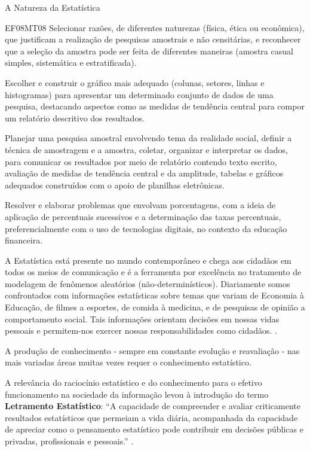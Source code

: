 \begin{apresentacao}{A Natureza da Estatística}
\begin{habilities}{EF08MT08}
Selecionar razões, de diferentes naturezas (física, ética ou econômica), que justificam a realização de pesquisas amostrais e não censitárias, e reconhecer que a seleção da amostra pode ser feita de diferentes maneiras (amostra casual simples, sistemática e estratificada).

Escolher e construir o gráfico mais adequado (colunas, setores, linhas e histogramas) para apresentar um determinado conjunto de dados de uma pesquisa, destacando aspectos como as medidas de tendência central para compor um relatório descritivo dos resultados.

Planejar uma pesquisa amostral envolvendo tema da realidade social, definir a técnica de amostragem e a amostra, coletar, organizar e interpretar os dados, para comunicar os resultados por meio de relatório contendo texto escrito, avaliação de medidas de tendência central e da amplitude, tabelas e gráficos adequados construídos com o apoio de planilhas eletrônicas.

Resolver e elaborar problemas que envolvam porcentagens, com a ideia de aplicação de percentuais sucessivos e a determinação das taxas percentuais, preferencialmente com o uso de tecnologias digitais, no contexto da educação financeira.
\end{habilities}

A Estatística está presente no mundo contemporâneo e chega aos cidadãos em todos os meios de comunicação e é a ferramenta por excelência no tratamento de modelagem de fenômenos aleatórios (não-determinísticos). Diariamente somos confrontados com informações estatísticas sobre temas que variam de Economia à Educação, de filmes a esportes, de comida à medicina, e de pesquisas de opinião a comportamento social. Tais informações orientam decisões em nossas vidas pessoais e permitem-nos exercer nossas responsabilidades como cidadãos. \citep{franklin2007}.

A produção de conhecimento - sempre em constante evolução e reavaliação - nas mais variadas áreas muitas vezes requer o conhecimento estatístico.

A relevância do raciocínio estatístico e do conhecimento para o efetivo funcionamento na sociedade da informação levou à introdução do termo \textbf{Letramento Estatístico}: “A capacidade de compreender e avaliar criticamente resultados estatísticos que permeiam a vida diária,  acompanhada da capacidade de apreciar como o pensamento estatístico pode contribuir em decisões públicas e privadas, profissionais e pessoais.” \citep{batanero2016}.


\end{apresentacao}
